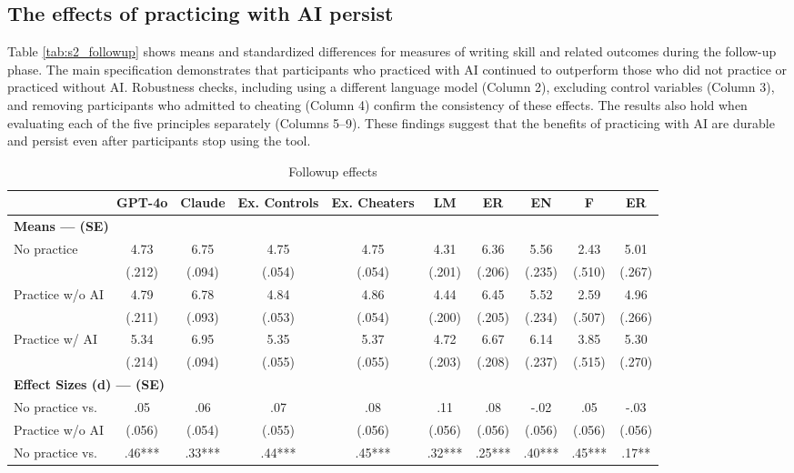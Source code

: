 \documentclass[11pt]{report}
\begin{document}
\begin{append}
\subsection{The effects of practicing with AI persist}\label{sec:persists2}
Table \ref{tab:s2_followup} shows means and standardized differences for measures of writing skill and related outcomes during the follow-up phase. The main specification demonstrates that participants who practiced with AI continued to outperform those who did not practice or practiced without AI. Robustness checks, including using a different language model (Column 2), excluding control variables (Column 3), and removing participants who admitted to cheating (Column 4) confirm the consistency of these effects. The results also hold when evaluating each of the five principles separately (Columns 5–9). These findings suggest that the benefits of practicing with AI are durable and persist even after participants stop using the tool.
\begin{table}[h]
    \centering
    \caption{Followup effects}
\footnotesize
\begin{tabular}{lccccccccc}
\toprule
  & GPT-4o & Claude & Ex. Controls & Ex. Cheaters & LM & ER & EN & F & ER \\ 
\midrule
\multicolumn{10}{l}{\textbf{Means --- (SE)}} \\ 
\midrule
No practice & 4.73 & 6.75 & 4.75 & 4.75 & 4.31 & 6.36 & 5.56 & 2.43 & 5.01 \\ 
 & (.212) & (.094) & (.054) & (.054) & (.201) & (.206) & (.235) & (.510) & (.267) \\ 
Practice w/o AI & 4.79 & 6.78 & 4.84 & 4.86 & 4.44 & 6.45 & 5.52 & 2.59 & 4.96 \\ 
 & (.211) & (.093) & (.053) & (.054) & (.200) & (.205) & (.234) & (.507) & (.266) \\ 
Practice w/ AI & 5.34 & 6.95 & 5.35 & 5.37 & 4.72 & 6.67 & 6.14 & 3.85 & 5.30 \\ 
 & (.214) & (.094) & (.055) & (.055) & (.203) & (.208) & (.237) & (.515) & (.270) \\ 
\midrule
\multicolumn{10}{l}{\textbf{Effect Sizes (d) --- (SE)}} \\ 
\midrule
No practice vs.  & .05 & .06 & .07 & .08 & .11 & .08 & -.02 & .05 & -.03 \\ 
 Practice w/o AI& (.056) & (.054) & (.055) & (.056) & (.056) & (.056) & (.056) & (.056) & (.056) \\ 
No practice vs.  & .46*** & .33*** & .44*** & .45*** & .32*** & .25*** & .40*** & .45*** & .17** \\ 

\end{tabular}
\end{table}
\end{append}
\end{document}
